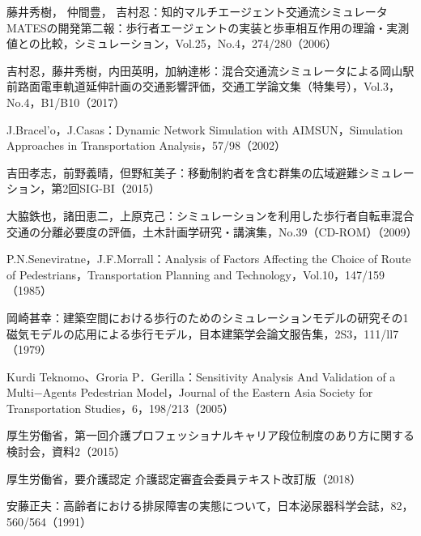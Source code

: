 \begin{thebibliography}{99}
  藤井秀樹， 仲間豊， 吉村忍：知的マルチエージェント交通流シミュレータMATESの開発第二報：歩行者エージェントの実装と歩車相互作用の理論・実測値との比較，シミュレーション，Vol.25，No.4，274/280（2006）

  吉村忍，藤井秀樹，内田英明，加納達彬：混合交通流シミュレータによる岡山駅前路面電車軌道延伸計画の交通影響評価，交通工学論文集（特集号），Vol.3，No.4，B1/B10（2017）

  J.Bracel’o，J.Casas：Dynamic Network Simulation with AIMSUN，Simulation Approaches in Transportation Analysis，57/98（2002）

  吉田孝志，前野義晴，但野紅美子：移動制約者を含む群集の広域避難シミュレーション，第2回SIG-BI（2015）

  大脇鉄也，諸田恵二，上原克己：シミュレーションを利用した歩行者自転車混合交通の分離必要度の評価，土木計画学研究・講演集，No.39（CD-ROM）（2009）

  P.N.Seneviratne，J.F.Morrall：Analysis of Factors Affecting the Choice of Route of Pedestrians，Transportation Planning and Technology，Vol.10，147/159（1985）

  岡崎甚幸：建築空間における歩行のためのシミュレーションモデルの研究その1 磁気モデルの応用による歩行モデル，目本建築学会論文服告集，2S3，111/ll7（1979）

  Kurdi Teknomo、Groria P．Gerilla：Sensitivity Analysis And Validation of a Multi−Agents Pedestrian Model，Journal of the Eastern Asia Society for Transportation Studies，6，198/213（2005）


  厚生労働省，第一回介護プロフェッショナルキャリア段位制度のあり方に関する検討会，資料2（2015）

  厚生労働省，要介護認定 介護認定審査会委員テキスト改訂版（2018） 

   安藤正夫：高齢者における排尿障害の実態について，日本泌尿器科学会誌，82，560/564（1991）
\end{thebibliography}
